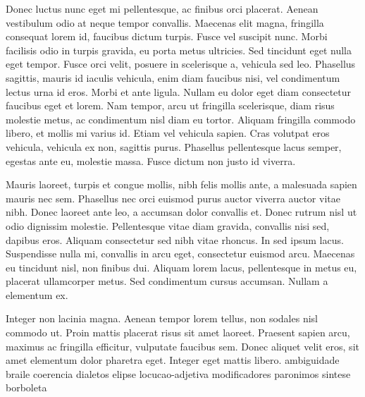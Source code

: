 Donec luctus nunc eget mi pellentesque, ac finibus orci placerat. Aenean vestibulum odio at neque tempor convallis. Maecenas elit magna, fringilla consequat lorem id, faucibus dictum turpis. Fusce vel suscipit nunc. Morbi facilisis odio in turpis gravida, eu porta metus ultricies. Sed tincidunt eget nulla eget tempor. Fusce orci velit, posuere in scelerisque a, vehicula sed leo. Phasellus sagittis, mauris id iaculis vehicula, enim diam faucibus nisi, vel condimentum lectus urna id eros. Morbi et ante ligula. Nullam eu dolor eget diam consectetur faucibus eget et lorem. Nam tempor, arcu ut fringilla scelerisque, diam risus molestie metus, ac condimentum nisl diam eu tortor. Aliquam fringilla commodo libero, et mollis mi varius id. Etiam vel vehicula sapien. Cras volutpat eros vehicula, vehicula ex non, sagittis purus. Phasellus pellentesque lacus semper, egestas ante eu, molestie massa. Fusce dictum non justo id viverra.

	
	\begin{quadro}[ht!]	
		\centering
	\end{quadro}

Mauris laoreet, turpis et congue mollis, nibh felis mollis ante, a malesuada sapien mauris nec sem. Phasellus nec orci euismod purus auctor viverra auctor vitae nibh. Donec laoreet ante leo, a accumsan dolor convallis et. Donec rutrum nisl ut odio dignissim molestie. Pellentesque vitae diam gravida, convallis nisi sed, dapibus eros. Aliquam consectetur sed nibh vitae rhoncus. In sed ipsum lacus. Suspendisse nulla mi, convallis in arcu eget, consectetur euismod arcu. Maecenas eu tincidunt nisl, non finibus dui. Aliquam lorem lacus, pellentesque in metus eu, placerat ullamcorper metus. Sed condimentum cursus accumsan. Nullam a elementum ex.

Integer non lacinia magna. Aenean tempor lorem tellus, non sodales nisl commodo ut. Proin mattis placerat risus sit amet laoreet. Praesent sapien arcu, maximus ac fringilla efficitur, vulputate faucibus sem. Donec aliquet velit eros, sit amet elementum dolor pharetra eget. Integer eget mattis libero.
\Gls{ambiguidade}
\Gls{braile}
\Gls{coerencia}
\Gls{dialetos}
\Gls{elipse}
\Gls{locucao-adjetiva}
\Gls{modificadores}
\Gls{paronimos}
\Gls{sintese}
\Gls{borboleta}